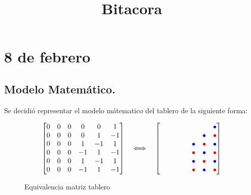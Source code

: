 \documentclass[12pt,a4paper]{article}
\title{Bitacora}
\date{}
\begin{document}
 
\maketitle


\section{8 de febrero}

\subsection{Modelo Matemático.}

Se decidió representar el modelo mátematico del tablero de la siguiente forma:


\begin{figure}[H]
\[
\begin{bmatrix}
0 & 0 & 0 & 0 &  0 &  1 \\
0 & 0 & 0 & 0 &  1 & -1 \\
0 & 0 & 0 &  1 & -1 &  1 \\
0 & 0 & 0 & -1 &  1 & -1 \\
0 & 0 & 0 &  1 & -1 &  1 \\
0 & 0 & 0 & -1 &  1 & -1
\end{bmatrix}
\quad \Longleftrightarrow \quad
\begin{bmatrix}
\phantom{\bullet} & \phantom{\bullet} & \phantom{\bullet} & \phantom{\bullet} & \phantom{\bullet} & \textcolor{blue}{\bullet} \\
\phantom{\bullet} & \phantom{\bullet} & \phantom{\bullet} & \phantom{\bullet} & \textcolor{blue}{\bullet} & \textcolor{red}{\bullet} \\
\phantom{\bullet} & \phantom{\bullet} & \phantom{\bullet} & \textcolor{blue}{\bullet} & \textcolor{red}{\bullet} & \textcolor{blue}{\bullet} \\
\phantom{\bullet} & \phantom{\bullet} & \phantom{\bullet} & \textcolor{red}{\bullet} & \textcolor{blue}{\bullet} & \textcolor{red}{\bullet} \\
\phantom{\bullet} & \phantom{\bullet} & \phantom{\bullet} & \textcolor{blue}{\bullet} & \textcolor{red}{\bullet} & \textcolor{blue}{\bullet} \\
\phantom{\bullet} & \phantom{\bullet} & \phantom{\bullet} & \textcolor{red}{\bullet} & \textcolor{blue}{\bullet} & \textcolor{red}{\bullet}
\end{bmatrix}
\]
  \caption{Equivalencia matriz tablero}
\end{figure}
\end{document}
